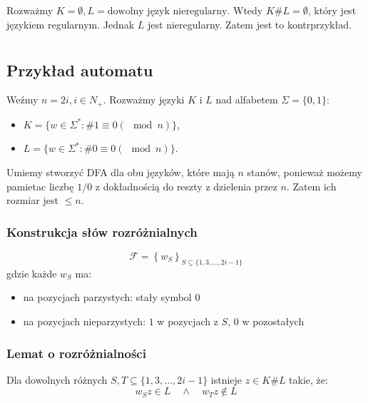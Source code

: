 \documentclass{article}
\theoremstyle{definition}
\theoremstyle{remark}
\begin{document}
\section{}

Rozważmy \(K = \emptyset, L = \text{dowolny język nieregularny}\). Wtedy
\(K \# L = \emptyset\), który jest językiem regularnym. Jednak \(L\)
jest nieregularny. Zatem jest to kontrprzykład.

\section{}

\subsection{Przykład automatu}

Weźmy \(n = 2i, i \in N_+\).
Rozważmy języki \(K\) i \(L\) nad alfabetem \(\Sigma = \{0, 1\}\):
\begin{itemize}
    \item \(K = \{ w \in \Sigma^* : \# 1 \equiv 0 (\mod n) \}\),
    \item \(L = \{ w \in \Sigma^* : \# 0 \equiv 0 (\mod n) \}\).
\end{itemize}

Umiemy stworzyć DFA dla obu języków, które mają \(n\) stanów,
ponieważ możemy pamietac liczbę \(1/0\) z dokładnością do reszty z dzielenia przez \(n\).
Zatem ich rozmiar jest \(\leq n\).

\subsubsection{Konstrukcja słów rozróżnialnych}

\[
\mathcal{F} = \left\{ w_S \right\} _{S \subseteq \{1,3,\dots,2i-1\}}
\]
gdzie każde $w_S$ ma:
\begin{itemize}
    \item na pozycjach parzystych: stały symbol $0$
    \item na pozycjach nieparzystych: $1$ w pozycjach z $S$, $0$ w pozostałych
\end{itemize}

\subsubsection{Lemat o rozróżnialności}
Dla dowolnych różnych $S, T \subseteq \{1,3,\dots,2i-1\}$ istnieje \(z \in K \# L\) takie, że:
\[
w_S z \in L \quad \land \quad w_T z \notin L
\]
\end{document}
